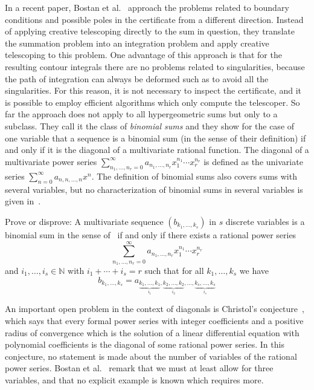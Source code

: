 \documentclass{jssc}
\let\set\mathbb
\begin{document}
 In a recent paper, Bostan et al.~\cite{bostan15} approach the problems related to boundary
 conditions and possible poles in the certificate from a different direction. Instead of applying
 creative telescoping directly to the sum in question, they translate the summation
 problem into an integration problem and apply creative telescoping to this problem.
 One advantage of this approach is that for the resulting contour integrals
 there are no problems related to singularities, because the path of integration can
 always be deformed such as to avoid all the singularities. For this reason, it is not
 necessary to inspect the certificate, and it is possible to employ efficient algorithms
 which only compute the telescoper.
 So far the approach does not apply to all hypergeometric sums but only to a subclass. They
 call it the class of \emph{binomial sums} and they show for the case of one variable
 that a sequence is a binomial sum (in the sense of their definition) if and only if it
 is the diagonal of a multivariate rational function. The diagonal of a multivariate
 power series $\sum_{n_1,\dots,n_r=0}^\infty a_{n_1,\dots,n_r}x_1^{n_1}\cdots x_r^{n_r}$
 is defined as the univariate series $\sum_{n=0}^\infty a_{n,n,\dots,n}x^n$.
 The definition of binomial sums also covers sums with several variables, but no
 characterization of binomial sums in several variables is given in~\cite{bostan15}.

 \begin{problem}
   Prove or disprove:
   A multivariate sequence $(b_{k_1,\dots,k_s})$ in $s$ discrete variables is a binomial
   sum in the sense of~\cite{bostan15}
   if and only if there exists a rational power series
   \[\sum_{n_1,\dots,n_r=0}^\infty a_{n_1,\dots,n_r}x_1^{n_1}\cdots x_r^{n_r}\]
   and $i_1,\dots,i_s\in\set N$ with $i_1+\cdots+i_s=r$ such that
   for all $k_1,\dots,k_s$ we have
   \[
   b_{k_1,\dots,k_s}=a_{
     \underbrace{\scriptstyle k_1,\dots,k_1}_{i_1},
     \underbrace{\scriptstyle k_2,\dots,k_2}_{i_2},\dots,
     \underbrace{\scriptstyle k_s,\dots,k_s}_{i_s}}
   \]
 \end{problem}

 An important open problem in the context of diagonals is Christol's
 conjecture~\cite{christol88}, which says that every formal power series with integer
 coefficients and a positive radius of convergence which is the solution of a
 linear differential equation with polynomial coefficients is the diagonal of
 some rational power series. In this conjecture, no statement is made about the
 number of variables of the rational power series. Bostan et al.~\cite{bostan15}
 remark that we must at least allow for three variables, and that no explicit
 example is known which requires more.
\end{document}
